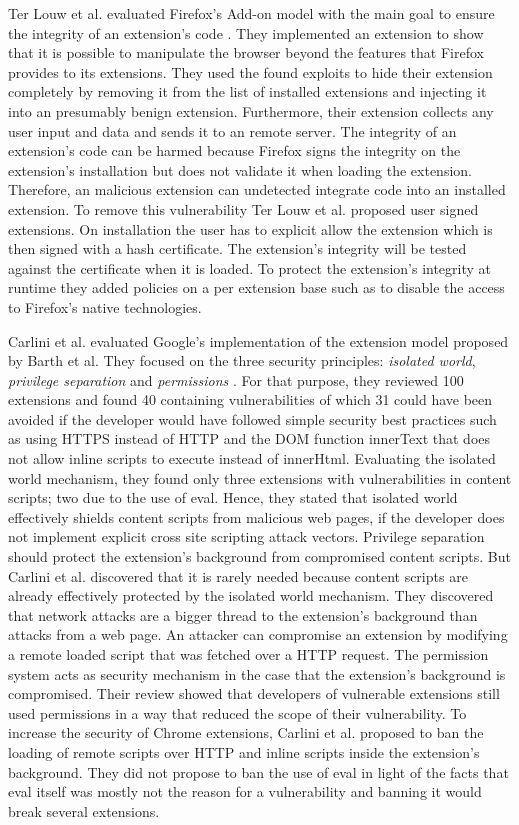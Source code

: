 	Ter Louw et al. evaluated Firefox's Add-on model with the main goal to ensure the integrity of an extension's code \cite{TerLouw:2007:EWB:1420581.1420583}. They implemented an extension to show that it is possible to manipulate the browser beyond the features that Firefox provides to its extensions. They used the found exploits to hide their extension completely by removing it from the list of installed extensions and injecting it into an presumably benign extension. Furthermore, their extension collects any user input and data and sends it to an remote server. The integrity of an extension's code can be harmed because Firefox signs the integrity on the extension's installation but does not validate it when loading the extension. Therefore, an malicious extension can undetected integrate code into an installed extension. To remove this vulnerability Ter Louw et al. proposed user signed extensions. On installation the user has to explicit allow the extension which is then signed with a hash certificate. The extension's integrity will be tested against the certificate when it is loaded. To protect the extension's integrity at runtime they added policies on a per extension base such as to disable the access to Firefox's native technologies. 
	
	Carlini et al. evaluated Google's implementation of the extension model proposed by Barth et al. They focused on the three security principles: \textit{isolated world}, \textit{privilege separation} and \textit{permissions} \cite{Carlini:2012:EGC:2362793.2362800, Barth10protectingbrowsers}. For that purpose, they reviewed 100 extensions and found 40 containing vulnerabilities of which 31 could have been avoided if the developer would have followed simple security best practices such as using HTTPS instead of HTTP and the DOM function innerText that does not allow inline scripts to execute instead of innerHtml. Evaluating the isolated world mechanism, they found only three extensions with vulnerabilities in content scripts; two due to the use of eval. Hence, they stated that isolated world effectively shields content scripts from malicious web pages, if the developer does not implement explicit cross site scripting attack vectors. Privilege separation should protect the extension's background from compromised content scripts. But Carlini et al. discovered that it is rarely needed because content scripts are already effectively protected by the isolated world mechanism. They discovered that network attacks are a bigger thread to the extension's background than attacks from a web page. An attacker can compromise an extension by modifying a remote loaded script that was fetched over a HTTP request. The permission system acts as security mechanism in the case that the extension's background is compromised. Their review showed that developers of vulnerable extensions still used permissions in a way that reduced the scope of their vulnerability. To increase the security of Chrome extensions, Carlini et al. proposed to ban the loading of remote scripts over HTTP and inline scripts inside the extension's background. They did not propose to ban the use of eval in light of the facts that eval itself was mostly not the reason for a vulnerability and banning it would break several extensions. 
	
